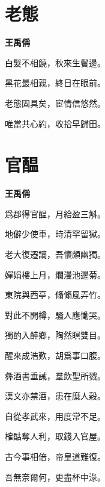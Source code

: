 \documentclass[12pt,a4paper]{ctexbook}
\begin{document}
\section{老態}
\textbf{王禹偁}\par\vspace{0.5em}
白髮不相饒，秋來生鬢邊。\par
黑花最相親，終日在眼前。\par
老態固具矣，宦情信悠然。\par
唯當共心約，收拾早歸田。\par

\section{官醖}
\textbf{王禹偁}\par\vspace{0.5em}
爲郡得官醖，月給盈三斛。\par
地僻少使車，時清罕留獄。\par
老大復遷謫，吾懷頗幽獨。\par
嬋娟樓上月，爛漫池邊菊。\par
東院與西亭，翛翛風弄竹。\par
對此不開樽，騷人應慟哭。\par
獨酌入醉鄉，陶然瞑雙目。\par
醒來成浩歎，胡爲事口腹。\par
彝酒書垂誡，羣飲聖所戮。\par
漢文亦禁酒，患在糜人穀。\par
自從孝武來，用度常不足。\par
榷酤奪人利，取錢入官屋。\par
古今事相倍，帝皇道難復。\par
吾無奈爾何，更盡杯中淥。\par
\end{document}
